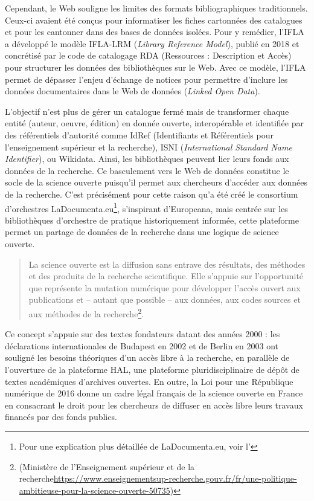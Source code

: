 Cependant, le Web souligne les limites des formats bibliographiques traditionnels. Ceux-ci avaient été conçus pour informatiser les fiches cartonnées des catalogues et pour les cantonner dans des bases de données isolées. 
Pour y remédier, l’IFLA a développé le modèle IFLA-LRM (\textit{Library Reference Model}), publié en 2018 et concrétisé par le code de catalogage RDA (Ressources : Description et Accès) pour structurer les données des bibliothèques sur le Web. Avec ce modèle, l’IFLA permet de dépasser l’enjeu d’échange de notices pour permettre d’inclure les données documentaires dans le Web de données (\textit{Linked Open Data}).

L’objectif n’est plus de gérer un catalogue fermé mais de transformer chaque entité (auteur, oeuvre, édition) en donnée ouverte, interopérable et identifiée par des référentiels d’autorité comme IdRef (Identifiants et Référentiels pour l’enseignement supérieur et la recherche), ISNI (\textit{International Standard Name Identifier}), ou Wikidata. Ainsi, les bibliothèques peuvent lier leurs fonds aux données de la recherche. Ce basculement vers le Web de données constitue le socle de la science ouverte puisqu’il permet aux chercheurs d’accéder aux données de la recherche. 
C’est précisément pour cette raison qu’a été créé le consortium d’orchestres LaDocumenta.eu\footnote{Pour une explication plus détaillée de LaDocumenta.eu, voir l'}, s'inspirant d'Europeana, mais centrée sur les bibliothèques d'orchestre de pratique historiquement informée, cette plateforme permet un partage de données de la recherche dans une logique de science ouverte.

\begin{quotation}La science ouverte est la diffusion sans entrave des résultats, des méthodes et des produits de la recherche scientifique. Elle s’appuie sur l’opportunité que représente la mutation numérique pour développer l’accès ouvert aux publications et – autant que possible – aux données, aux codes sources et aux méthodes de la recherche\footnote{(Ministère de l’Enseignement supérieur et de la recherche\url{https://www.enseignementsup-recherche.gouv.fr/fr/une-politique-ambitieuse-pour-la-science-ouverte-50735})}.\end{quotation} 

Ce concept s’appuie sur des textes fondateurs datant des années 2000 : les déclarations internationales de Budapest en 2002 et de Berlin en 2003 ont souligné les besoins théoriques d’un accès libre à la recherche, en parallèle de l'ouverture de la plateforme HAL, une plateforme pluridisciplinaire de dépôt de textes académiques d’archives ouvertes. En outre, la Loi pour une République numérique de 2016 donne un cadre légal français de la science ouverte en France en consacrant le droit pour les chercheurs de diffuser en accès libre leurs travaux financés par des fonds publics.

